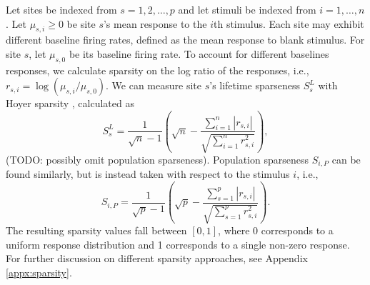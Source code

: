 \documentclass[draft]{cmustatproposal} %
\newcommand{\todo}[1]{{\color{purple}#1}}
\begin{document}
Let sites be indexed from \( s = 1, 2, \dots, p \) and let stimuli be indexed from \( i = 1, \dots, n \). Let \(\mu_{s, i} \geq 0 \) be site \( s \)'s mean response to the \(i\)th stimulus. Each site may exhibit different baseline firing rates, defined as the mean response to blank stimulus. For site \( s \), let \( \mu_{s, 0} \) be its baseline firing rate. To account for different baselines responses, we calculate sparsity on the log ratio of the responses, i.e., \( r_{s, i } = \log \left( \mu_{s, i} / \mu_{s, 0} \right) \). We can measure site \( s \)'s lifetime sparseness \( S_{s}^{L} \) with Hoyer sparsity \cite{hoyer_non-negative_2004}, calculated as
\begin{equation}
\label{eqn:sparsity_lifetime}
S_{s}^{L} = \frac{1}{\sqrt{n} - 1} \left( \sqrt{n} - \frac{\sum_{i = 1}^n |r_{s, i}|}{\sqrt{\sum_{i = 1}^n r_{s, i}^2}} \right),
\end{equation}
\todo{(TODO: possibly omit population sparseness).} Population sparseness \( S_{i, P} \) can be found similarly, but is instead taken with respect to the stimulus \( i \), i.e.,
\begin{equation}
\label{eqn:sparsity_population}
S_{i, P} = \frac{1}{\sqrt{p} - 1} \left( \sqrt{p} - \frac{\sum_{s = 1}^p |r_{s, i}|}{\sqrt{\sum_{s = 1}^p r_{s, i}^2}} \right).
\end{equation}
The resulting sparsity values fall between \( [0, 1] \), where 0 corresponds to a uniform response distribution and 1 corresponds to a single non-zero response. For further discussion on different sparsity approaches, see Appendix \ref{appx:sparsity}.
\end{document}
